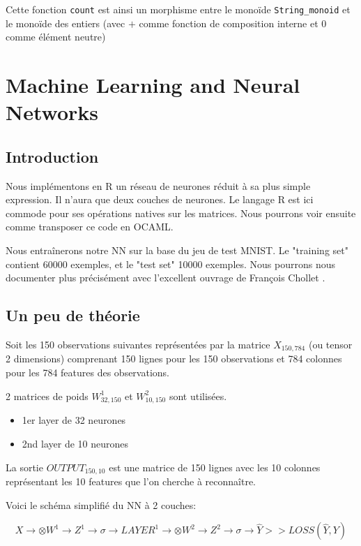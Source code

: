 \documentclass[11pt]{book}
\begin{document}
Cette fonction \verb+count+ est ainsi un morphisme entre le monoïde \verb+String_monoid+ et 
le monoïde des entiers (avec $+$ comme fonction de composition interne et $0$
comme élément neutre)
\section{Machine Learning and Neural Networks}

\subsection{Introduction}

Nous implémentons en R un réseau de neurones réduit à sa plus simple expression.
Il n'aura que deux couches de neurones.
Le langage R est ici commode pour ses opérations natives sur les matrices.
Nous pourrons voir ensuite comme transposer ce code en OCAML.

Nous entraînerons notre NN sur la base du jeu de test MNIST.
Le  "training set" contient 60000 exemples, et le "test set" 10000 exemples.
Nous pourrons nous documenter plus précisément avec l'excellent ouvrage de François Chollet \cite{deepR}.

\subsection{Un peu de théorie}

Soit les 150 observations suivantes représentées par la matrice $X_{150,784}$ (ou tensor 2 dimensions) comprenant 150 lignes pour les 150 observations et 784 colonnes pour les 784 features des observations.

2 matrices de poids $W^1_{32,150}$ et $W^2_{10,150}$ sont utilisées.

\begin{itemize}
	\item 1er layer de 32 neurones
	\item 2nd layer de 10 neurones
\end{itemize}

La sortie $OUTPUT_{150,10}$ est une matrice de 150 lignes avec les 10 colonnes représentant 
les 10 features que l'on cherche à reconnaître.

Voici le schéma simplifié du NN à 2 couches:

$$
X \longrightarrow \otimes W^1 \rightarrow  Z^1 \rightarrow \sigma \rightarrow LAYER^1 \longrightarrow
\otimes W^2 
\rightarrow Z^2 
\rightarrow 
\sigma 
\rightarrow \hat{Y} 
>> LOSS(\hat{Y}, Y)
$$
\end{document}
